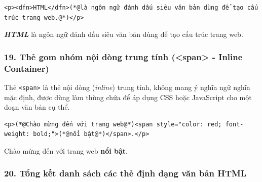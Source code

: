 \documentclass[11pt,oneside]{book}
\newcommand{\codeinline}[1]{\textcolor{accentOrange}{\texttt{#1}}}
\begin{document}
\begin{codeWindow}
\begin{lstlisting}[language=HTML5]
<p><dfn>HTML</dfn>(*@là ngôn ngữ đánh dấu siêu văn bản dùng để tạo cấu trúc trang web.@*)</p>
\end{lstlisting}
\end{codeWindow}

\begin{tcolorbox}[
    enhanced, colback=white, colframe=primaryBlue!20, arc=6pt, boxrule=0.8pt, drop shadow=black!3!white,
    top=8pt, bottom=8pt, left=12pt, right=12pt,
    title={\sffamily\bfseries\scriptsize\color{codeComment} KẾT QUẢ HIỂN THỊ TRÊN TRÌNH DUYỆT (BROWSER PREVIEW)},
    coltitle=codeComment, colbacktitle=codeBg!80!white
]
\textbf{\textit{HTML}} là ngôn ngữ đánh dấu siêu văn bản dùng để tạo cấu trúc trang web.
\end{tcolorbox}

\subsubsection{19. Thẻ gom nhóm nội dòng trung tính (<span> - Inline Container)}

Thẻ \codeinline{<span>} là thẻ nội dòng (\textit{inline}) trung tính, không mang ý nghĩa ngữ nghĩa mặc định, được dùng làm thùng chứa để áp dụng CSS hoặc JavaScript cho một đoạn văn bản cụ thể.

\begin{codeWindow}
\begin{lstlisting}[language=HTML5]
<p>(*@Chào mừng đến với trang web@*)<span style="color: red; font-weight: bold;">(*@nổi bật@*)</span>.</p>
\end{lstlisting}
\end{codeWindow}

\begin{tcolorbox}[
    enhanced, colback=white, colframe=primaryBlue!20, arc=6pt, boxrule=0.8pt, drop shadow=black!3!white,
    top=8pt, bottom=8pt, left=12pt, right=12pt,
    title={\sffamily\bfseries\scriptsize\color{codeComment} KẾT QUẢ HIỂN THỊ TRÊN TRÌNH DUYỆT (BROWSER PREVIEW)},
    coltitle=codeComment, colbacktitle=codeBg!80!white
]
Chào mừng đến với trang web \textbf{\color{red}nổi bật}.
\end{tcolorbox}

\subsubsection{20. Tổng kết danh sách các thẻ định dạng văn bản HTML}
\end{document}
